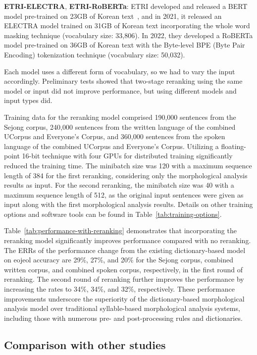 \documentclass[AMS,STIX2COL]{WileyNJD-v2}
\begin{document}
    \textbf{ETRI-ELECTRA}, \textbf{ETRI-RoBERTa}: ETRI developed and released a BERT model pre-trained on 23GB of Korean text~\cite{KorBERT}, and in 2021, it released an ELECTRA model trained on 31GB of Korean text incorporating the whole word masking technique (vocabulary size: 33,806).
    In 2022, they developed a RoBERTa model pre-trained on 36GB of Korean text with the Byte-level BPE (Byte Pair Encoding) tokenization technique (vocabulary size: 50,032).

    Each model uses a different form of vocabulary, so we had to vary the input accordingly.
    Preliminary tests showed that two-stage reranking using the same model or input did not improve performance, but using different models and input types did.

    Training data for the reranking model comprised 190,000 sentences from the Sejong corpus, 240,000 sentences from the written language of the combined UCorpus and Everyone's Corpus, and 360,000 sentences from the spoken language of the combined UCorpus and Everyone's Corpus.
    Utilizing a floating-point 16-bit technique with four GPUs for distributed training significantly reduced the training time.
    The minibatch size was 120 with a maximum sequence length of 384 for the first reranking, considering only the morphological analysis results as input.
    For the second reranking, the minibatch size was 40 with a maximum sequence length of 512, as the original input sentences were given as input along with the first morphological analysis results.
    Details on other training options and software tools can be found in Table~\ref{tab:training-options}.

    Table~\ref{tab:performance-with-reranking} demonstrates that incorporating the reranking model significantly improves performance compared with no reranking.
    The ERRs of the performance change from the existing dictionary-based model on eojeol accuracy are 29\%, 27\%, and 20\% for the Sejong corpus, combined written corpus, and combined spoken corpus, respectively, in the first round of reranking.
    The second round of reranking further improves the performance by increasing the rates to 34\%, 34\%, and 32\%, respectively.
    These performance improvements underscore the superiority of the dictionary-based morphological analysis model over traditional syllable-based morphological analysis systems, including those with numerous pre- and post-processing rules and dictionaries.

    \subsection{Comparison with other studies}\label{subsec:comparison-to-other-studies}
\end{document}
